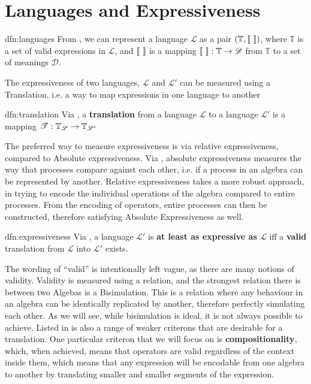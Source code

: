 \documentclass[../hons_project.tex]{subfiles}
\begin{document}
    
\section{Languages and Expressiveness}\label{ssec:language}

\begin{dfn}[Languages]{dfn:languages}{}
   From \cite{DBLP:conf/fossacs/Glabbeek18}, we can represent a language $\mathscr{L}$ as a pair $(\mathbb{T}, \llbracket \,\, \rrbracket)$, where $\mathbb{T}$ is a set of valid expressions in $\mathscr{L}$, and $\llbracket \,\, \rrbracket$ is a mapping $\llbracket \,\, \rrbracket : \mathbb{T} \to \mathscr{D}$ from $\mathbb{T}$ to a set of meanings $\mathscr{D}$.
\end{dfn}

The expressiveness of two languages, $\mathscr{L}$ and $\mathscr{L}'$ can be measured using a Translation, i.e. a way to map expressions in one language to another
\begin{dfn}[Translation]{dfn:translation}{}
   Via  \cite{DBLP:conf/fossacs/Glabbeek18}, a \textbf{translation} from a language $\mathscr{L}$ to a language $\mathscr{L'}$ is a mapping $\mathscr{T} : \mathbb{T}_{\mathscr{L}} \to \mathbb{T}_{\mathscr{L}'}$
\end{dfn}



The preferred way to measure expressiveness is via relative expressiveness, compared to Absolute expressiveness. Via \cite{parrowExpressivenessProcessAlgebras2008}, absolute expressiveness measures the way that processes compare against each other, i.e. if a process in an algebra can be represented by another. Relative expressiveness takes a more robust approach, in trying to encode the individual operations of the algebra compared to entire processes. From the encoding of operators, entire processes can then be constructed, therefore satisfying Absolute Expressiveness as well.

\begin{dfn}[Expressiveness]{dfn:expressiveness}{}
   Via  \cite{DBLP:conf/fossacs/Glabbeek18}, a language $\mathscr{L}'$ is \textbf{at least as expressive as $\mathscr{L}$} iff a \textbf{valid} translation from $\mathscr{L}$ into $\mathscr{L}'$ exists.
\end{dfn}

The wording of ``valid'' is intentionally left vague, as there are many notions of validity. Validity is measured using a relation, and the strongest relation there is between two Algebas is a Bisimulation. This is a relation where any behaviour in an algebra can be identically replicated by another, therefore perfectly simulating each other. As we will see, while bisimulation is ideal, it is not always possible to achieve. Listed in \cite{parrowExpressivenessProcessAlgebras2008} is also a range of weaker criterons that are desirable for a translation. One particular criteron that we will focus on is \textbf{compositionality}, which, when achieved, means that operators are valid regardless of the context inside them, which means that any expression will be encodable from one algebra to another by translating smaller and smaller segments of the expression.
\end{document}
